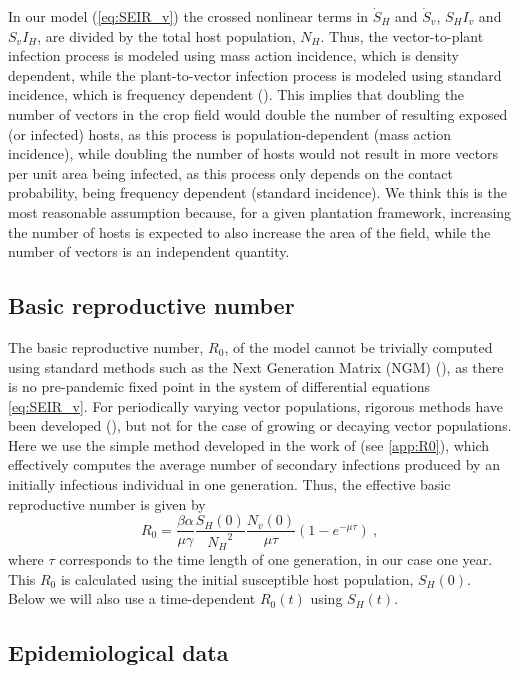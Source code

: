 In our model (\cref{eq:SEIR_v}) the crossed nonlinear terms in $\dot{S}_H$
and $\dot{S}_v$, $S_H I_v$ and $S_v I_H$, are divided by the total host
population, $N_H$. Thus, the vector-to-plant infection process is modeled using
mass action incidence, which is density dependent, while the plant-to-vector
infection process is modeled using standard incidence, which is frequency
dependent (\cite{MartchevaBook}). This implies that doubling the number of
vectors in the crop field would double the number of resulting exposed (or
infected) hosts, as this process is population-dependent (mass action
incidence), while doubling the number of hosts would not result in more vectors
per unit area being infected, as this process only depends on the contact
probability, being frequency dependent (standard incidence). We think this is
the most reasonable assumption because, for a given plantation framework,
increasing the number of hosts is expected to also increase the area of the
field, while the number of vectors is an independent quantity.

\subsection{Basic reproductive number}

The basic reproductive number, $R_0$, of the model cannot be trivially
computed using standard methods such as the Next Generation Matrix (NGM)
(\cite{Diekmann2010}), as there is no pre-pandemic fixed point in the system of
differential equations \cref{eq:SEIR_v}. For periodically varying vector
populations, rigorous methods have been developed (\cite{Bacaer2007}), but not
for the case of growing or decaying vector populations. Here we use the simple
method developed in the work of \cite{GimenezRomero2022_PRE} (see
\cref{app:R0}), which
effectively computes the average number of secondary infections produced by an
initially infectious individual in one generation. Thus, the effective basic
reproductive number is given by
\begin{equation}\label{eq:R0}
    R_0=\frac{\beta\alpha}{\mu\gamma}\frac{S_H(0)}{{N_H}^2}
    \frac{N_v(0)}{\mu\tau}\left(1-e^{-\mu\tau}\right)
    \ ,
\end{equation}
where $\tau$ corresponds to the time length of one generation, in our case
one year. This $R_0$ is calculated using the initial susceptible host
population, $S_H(0)$. Below we will also use a time-dependent $R_0(t)$ using
$S_H(t)$.

\subsection{Epidemiological data}

